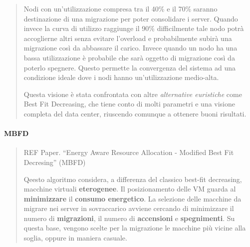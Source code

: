 \documentclass{article}
\begin{document}
\begin{quote}
		Nodi con un'utilizzazione compresa tra il 40\% e il 70\% saranno destinazione di una migrazione per poter consolidare i server. Quando invece la curva di utilizzo raggiunge il 90\% difficilmente tale nodo potrà accoglierne altri senza evitare l'overload e probabilmente subirà una migrazione così da abbassare il carico. Invece quando un nodo ha una bassa utilizzazione è probabile che sarà oggetto di migrazione così da poterlo spegnere. Questo permette la convergenza	del sistema ad una condizione ideale dove i	nodi hanno un'utilizzazione medio-alta.
		
		Questa visione è stata confrontata con altre \emph{alternative
		euristiche} come Best Fit Decreasing, che tiene conto di molti parametri e una visione completa del data center, riuscendo comunque a ottenere buoni risultati.
		\end{quote}
		
		\paragraph{MBFD}
		\begin{quote}
		REF Paper. ``Energy Aware Resource Allocation -
		Modified Best Fit Decresing'' (MBFD)
		
		Qeesto algoritmo considera, a differenza del classico best-fit decreasing, macchine virtuali \textbf{eterogenee}. Il posizionamento delle VM guarda al \textbf{minimizzare} il		\textbf{consumo energetico}. La selezione delle macchine da migrare nei server in sovraccarico avviene cercando di minimizzare il numero di \textbf{migrazioni}, il numero di \textbf{accensioni} e \textbf{spegnimenti}. Su questa base, vengono scelte per la migrazione le	macchine più vicine alla soglia, oppure in maniera casuale.
		\end{quote}
		
\end{document}

